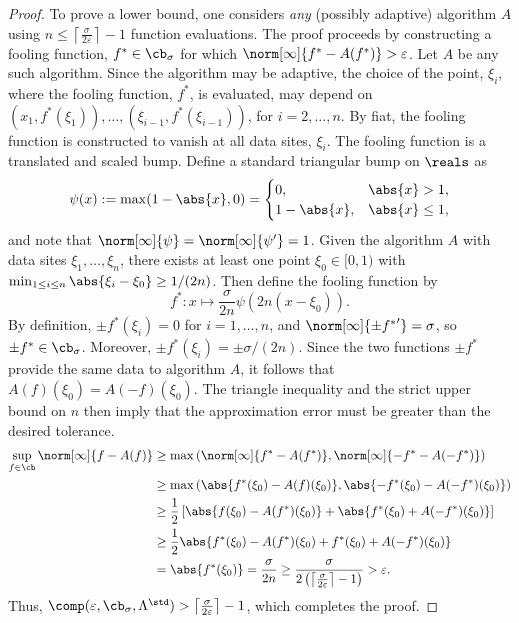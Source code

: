 \begin{proof}
To prove a lower bound, one considers \emph{any} (possibly adaptive) algorithm $A$ using $n\le \left \lceil \frac{\sigma}{2\varepsilon} \right \rceil - 1$ function evaluations.  The proof proceeds by constructing a fooling function, $f^* \in \cb_\sigma$ for which $\norm[\infty]{f^* - A(f^*)} > \varepsilon$.  Let $A$ be any such algorithm.  Since the algorithm may be adaptive, the choice of the point, $\xi_i$, where the fooling function, $f^*$, is evaluated, may depend on $(x_1,f^*(\xi_1)), \ldots, (\xi_{i-1},f^*(\xi_{i-1}))$, for $i=2, \ldots, n$. By fiat, the fooling function is constructed to vanish at all data sites, $\xi_i$.  The fooling function is a translated and scaled bump.  Define a standard triangular bump on $\reals$ as 
\begin{equation} \label{trianglebump}
\psi(x) : = \max(1-\abs{x},0) = \begin{cases}0, & \abs{x} > 1, \\
1-\abs{x}, & \abs{x} \le 1,
\end{cases}
\end{equation}
and note that $\norm[\infty]{\psi} = \norm[\infty]{\psi'}=1$.  Given the algorithm $A$ with data sites $\xi_1, \ldots, \xi_n$, there exists at least one point $\xi_0 \in [0,1)$ with $\min_{1 \le i \le n} \abs{\xi_i -\xi_0} \ge 1/(2n)$.  Then define the fooling function by 
\[
f^*: x \mapsto \frac{\sigma}{2n}\psi(2n(x-\xi_0)).
\]
By definition, $\pm f^*(\xi_i)=0$ for $i=1, \ldots, n$, and $\norm[\infty]{\pm{f^*}'} = \sigma$, so $\pm f^* \in \cb_\sigma$.   Moreover, $\pm f^*(\xi_i)= \pm \sigma/(2n)$.  Since the two functions $\pm f^*$ provide the same data to algorithm $A$, it follows that $A(f)(\xi_0)=A(-f)(\xi_0)$.  The triangle inequality and the strict upper bound on $n$ then imply that the approximation error must be greater than the desired tolerance.
\begin{align*}
\sup_{f \in \cb} \norm[\infty]{f - A(f)} 
&\ge \max\left(\norm[\infty]{f^* - A(f^*)},\norm[\infty]{-f^* - A(- f^*)}\right) \\ 
& \ge \max\left(\abs{f^*(\xi_0) - A(f)(\xi_0)},\abs{-f^*(\xi_0) - A(-f^*)(\xi_0)}\right) \\
& \ge \frac{1}{2} \left [ \abs{f(\xi_0) - A(f^*)(\xi_0)} + \abs{f^*(\xi_0)+ A(-f^*)(\xi_0)} \right ]\\
& \ge \frac{1}{2} \abs{f^*(\xi_0) - A(f^*)(\xi_0) + f^*(\xi_0) + A(-f^*)(\xi_0)}\\
& = \abs{f^*(\xi_0)} = \frac{\sigma}{2n} \ge \frac{\sigma}{2 \left(\left \lceil \frac{\sigma}{2\varepsilon} \right \rceil - 1\right)} > \varepsilon. 
\end{align*}
Thus, $\comp(\varepsilon,\cb_{\sigma},\Lambda^{\std}) > \left \lceil \frac{\sigma}{2\varepsilon} \right \rceil -1$, which completes the proof.
\end{proof}

